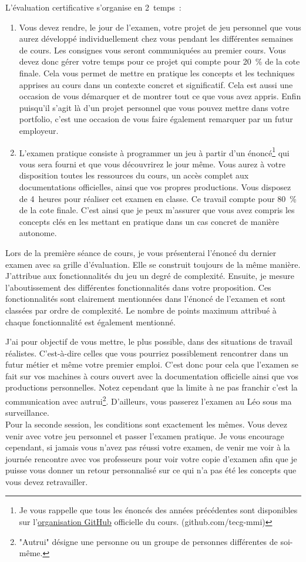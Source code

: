 \label{eval_certificative}
L’évaluation certificative s'organise en 2~temps~:
\begin{enumerate}
    \item Vous devez rendre, le jour de l'examen, votre projet de jeu personnel que vous aurez développé individuellement chez vous pendant les différentes semaines de cours. Les consignes vous seront communiquées au premier cours. Vous devez donc gérer votre temps pour ce projet qui compte pour 20~\% de la cote finale. Cela vous permet de mettre en pratique les concepts et les techniques apprises au cours dans un contexte concret et significatif. Cela est aussi une occasion de vous démarquer et de montrer tout ce que vous avez appris. Enfin puisqu'il s'agit là d'un projet personnel que vous pouvez mettre dans votre portfolio, c'est une occasion de vous faire également remarquer par un futur employeur.
    \item L'examen pratique consiste à programmer un jeu à partir d'un énoncé\footnote{Je vous rappelle que tous les énoncés des années précédentes sont disponibles sur l'\href{https://github.com/tecg-mmi}{organisation GitHub} officielle du cours. (github.com/tecg-mmi)} qui vous sera fourni et que vous découvrirez le jour même. Vous aurez à votre disposition toutes les ressources du cours, un accès complet aux documentations officielles, ainsi que vos propres productions. Vous disposez de 4~heures pour réaliser cet examen en classe. Ce travail compte pour 80~\% de la cote finale. C'est ainsi que je peux m'assurer que vous avez compris les concepts clés en les mettant en pratique dans un cas concret de manière autonome.
\end{enumerate}
Lors de la première séance de cours, je vous présenterai l'énoncé du dernier examen avec sa grille d'évaluation. Elle se construit toujours de la même manière. J'attribue aux fonctionnalités du jeu un degré de complexité. Ensuite, je mesure l'aboutissement des différentes fonctionnalités dans votre proposition. Ces fonctionnalités sont clairement mentionnées dans l'énoncé de l'examen et sont classées par ordre de complexité. Le nombre de points maximum attribué à chaque fonctionnalité est également mentionné.

J'ai pour objectif de vous mettre, le plus possible, dans des situations de travail réalistes. C'est-à-dire celles que vous pourriez possiblement rencontrer dans un futur métier et même votre premier emploi. C'est donc pour cela que l'examen se fait sur vos machines à cours ouvert avec la documentation officielle ainsi que vos productions personnelles. Notez cependant que la limite à ne pas franchir c'est la communication avec autrui\footnote{"Autrui" désigne une personne ou un groupe de personnes différentes de soi-même.}. D'ailleurs, vous passerez l'examen au Léo sous ma surveillance.\\
Pour la seconde session, les conditions sont exactement les mêmes. Vous devez venir avec votre jeu personnel et passer l'examen pratique. Je vous encourage cependant, si jamais vous n'avez pas réussi votre examen, de venir me voir à la journée rencontre avec vos professeurs pour voir votre copie d'examen afin que je puisse vous donner un retour personnalisé sur ce qui n'a pas été les concepts que vous devez retravailler.
\clearpage
